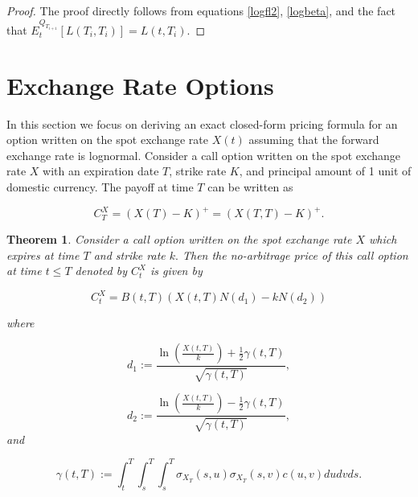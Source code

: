 \documentclass[11pt]{article}
\newtheorem{theorem}{Theorem}[section]
\begin{document}
\begin{proof}
The proof directly follows from equations \eqref{logfl2}, \eqref{logbeta}, and the fact that $E^{Q_{T_{i+1}}}_t[L(T_i,T_i)]=L(t,T_i).$
\end{proof}




\section{Exchange Rate Options}

In this section we focus on deriving an exact closed-form pricing formula for an option written on the spot exchange rate $X(t)$ assuming that the forward exchange rate is lognormal. Consider a call option written on the spot exchange rate $X$ with an expiration date $T$, strike rate $K$, and principal amount of 1 unit of domestic currency. The payoff at time $T$ can be written as 

\begin{equation*}
    C_T^X= (X(T)-K)^+= (X(T,T)-K)^+.
\end{equation*}



\begin{theorem}\label{exchangeoption}Consider a call option written on the spot exchange rate $X$ which expires at time $T$ and strike rate $k.$ Then the no-arbitrage price of this call option at time $t\leq T$ denoted by $C_t^X$ is given by 

\begin{equation}
    C_t^X=B(t,T)(X(t,T)N(d_1)-kN(d_2))
\end{equation}

where 

\begin{equation*}
    d_1:=\frac{\ln\left(\frac{X(t,T)}{k}\right)+\frac{1}{2}\gamma(t,T)}{\sqrt{\gamma(t,T)}},
\end{equation*}


\begin{equation*}
    d_2:= \frac{\ln\left(\frac{X(t,T)}{k}\right)-\frac{1}{2}\gamma(t,T)}{\sqrt{\gamma(t,T)}},
\end{equation*}
and 

\begin{equation*}
    \gamma(t,T):=\int_t^T\int_s^T\int_s^T \sigma_{X_T}(s,u)\sigma_{X_T}(s,v)c(u,v)dudvds.
\end{equation*}

\end{theorem}
\end{document}
